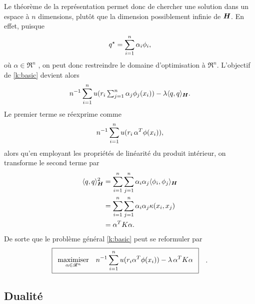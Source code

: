 Le théorème de la représentation permet donc de chercher une solution dans un espace à $n$
dimensions, plutôt que la dimension possiblement infinie de $\H$. En effet, puisque
\begin{equation}
  q^\star = \sumi \alpha_i \phi_i,
\end{equation}
où $\alpha \in \Re^n$ , on peut donc restreindre le domaine
d'optimisation à $\Re^n$. L'objectif de \eqref{k:basic} devient alors
\begin{equation}
  n^{-1}\sumi u(r_i \textstyle \sumj \alpha_j \phi_j(x_i)) - \lambda \langle q,q \rangle_{\H}. 
\end{equation}
Le premier terme se réexprime comme
\begin{equation}
  n^{-1} \sumi u(r_i\,\alpha^T\phi(x_i)),
\end{equation}
alors qu'en employant les propriétés de linéarité du produit intérieur, on transforme le
second terme par
\begin{align}
  \langle q,q \rangle^2_{\H} &= \sumi \sumj \alpha_i \alpha_j \langle \phi_i,\phi_j \rangle_{\H}\\
                 &= \sumi \sumj \alpha_i \alpha_j \kappa(x_i,x_j)\\
                 &= \alpha^T K \alpha.
\end{align}
De sorte que le problème général \eqref{k:basic} peut se reformuler par
\begin{equation}
  \boxed{\maximizeEquation[\alpha \in \Re^n]{n^{-1}\sumi u(r_i \alpha^T \phi(x_i)) - \lambda\,\alpha^TK\alpha}}\quad.
\end{equation}


\subsection{Dualité}


